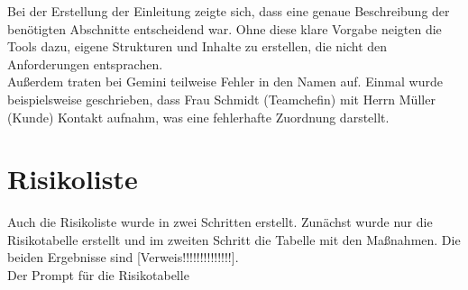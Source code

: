 Bei der Erstellung der Einleitung zeigte sich, dass eine genaue Beschreibung der benötigten Abschnitte entscheidend war. Ohne diese klare 
Vorgabe neigten die Tools dazu, eigene Strukturen und Inhalte zu erstellen, die nicht den Anforderungen entsprachen.\\

Außerdem traten bei Gemini teilweise Fehler in den Namen auf. Einmal wurde beispielsweise geschrieben, dass Frau Schmidt (Teamchefin) mit 
Herrn Müller (Kunde) Kontakt aufnahm, was eine fehlerhafte Zuordnung darstellt. %


\section{Risikoliste}  \label{CompRisikoliste}

Auch die Risikoliste wurde in zwei Schritten erstellt. Zunächst wurde nur die Risikotabelle erstellt und im zweiten 
Schritt die Tabelle mit den Maßnahmen. Die beiden Ergebnisse sind [Verweis!!!!!!!!!!!!!!].\\

Der Prompt für die Risikotabelle

